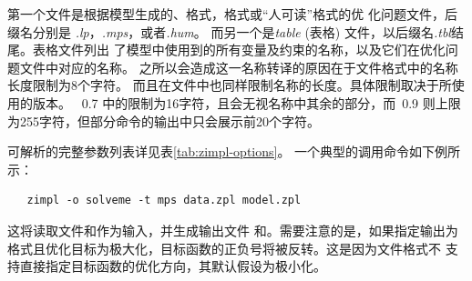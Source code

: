 第一个文件是根据模型生成的\cplex、\lp 格式，\mps 格式或“人可读”格式的优
化问题文件，后缀名分别是 \emph{.lp}，\emph{.mps}，或者\emph{.hum}。
而另一个是\emph{table} (表格) 文件，以后缀名\emph{.tbl}结尾。表格文件列出
了模型中使用到的所有变量及约束的名称，以及它们在优化问题文件中对应的名称。
之所以会造成这一名称转译的原因在于\mps 文件格式中的名称长度限制为8个字符。
而且在\lp 文件中也同样限制名称的长度。具体限制取决于所使用的版本。
\cplex~0.7 中的限制为16字符，且会无视名称中其余的部分，而\cplex~0.9 则上限
为255字符，但部分命令的输出中只会展示前20个字符。


\zimpl 可解析的完整参数列表详见表\ref{tab:zimpl-options}。
一个典型的\zimpl 调用命令如下例所示：%
\begin{verbatim}
   zimpl -o solveme -t mps data.zpl model.zpl
\end{verbatim}
这将读取文件和作为输入，并生成输出文件
和。需要注意的是，如果指定输出为\mps 
格式且优化目标为极大化，目标函数的正负号将被反转。这是因为\mps 文件格式不
支持直接指定目标函数的优化方向，其默认假设为极小化。

